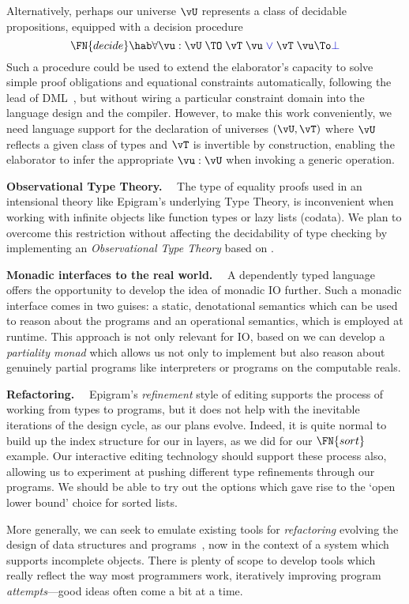 \documentclass{fundam}
\begin{document}
Alternatively, perhaps our universe $\vU$ represents a class of decidable
propositions, equipped with a decision procedure
\[
  \FN{decide}\hab\forall\vu:\vU\;\TO\;
    \vT\;\vu\;\blue{\vee}\;\vT\;\vu\To\blue{\bot}
\]
Such a procedure could be used to extend the elaborator's capacity to solve
simple proof obligations and equational constraints automatically, following
the lead of DML~\cite{DML99}, but without wiring a particular constraint
domain into the language design and the compiler.
However, to make this work conveniently, we need language support for the
declaration of universes $(\vU,\vT)$ where $\vU$ reflects a given class of
types and $\vT$ is invertible by construction, enabling the elaborator to
infer the appropriate $\vu:\vU$ when invoking a generic operation.


\textbf{Observational Type Theory.}$\quad$ The type of equality proofs
used in an intensional theory like Epigram's underlying Type Theory,
is inconvenient when working with infinite objects like function types
or lazy lists (codata). We plan to overcome this restriction without
affecting the decidability of type checking by implementing an
\emph{Observational Type Theory} based on \cite{alti:lics99,mh:phd}.

\textbf{Monadic interfaces to the real world.}$\quad$ A dependently typed
language offers the opportunity to develop the idea of monadic IO further.
Such a monadic interface comes in two guises: a static, denotational semantics
which can be used to reason about the programs and an operational semantics,
which is employed at runtime. This approach is not only relevant for IO,
based on \cite{venanzio-general} we can develop a \emph{partiality monad}
which allows us not only to implement but also reason about genuinely partial
programs like interpreters or programs on the computable reals. 

\textbf{Refactoring.}$\quad$ Epigram's
\emph{refinement} style of editing supports the process of working from
types to programs, but it does not help with the inevitable iterations
of the design cycle, as our plans evolve. Indeed, it is quite normal
to build up the index structure for our in layers, as we did for our
$\FN{sort}$ example. Our interactive editing technology should support
these process also, allowing us to experiment at pushing different
type refinements through our programs. We should be able to try out
the options which gave rise to the `open lower bound' choice for
sorted lists.

More generally, we can seek to emulate existing tools
for \emph{refactoring} evolving the design of data structures and
programs~\cite{kent-refactoring}, now in the context of a system which
supports incomplete objects. There is plenty of scope to develop tools
which really reflect the way most programmers work, iteratively improving
program \emph{attempts}---good ideas often come a bit at a time.
\end{document}
